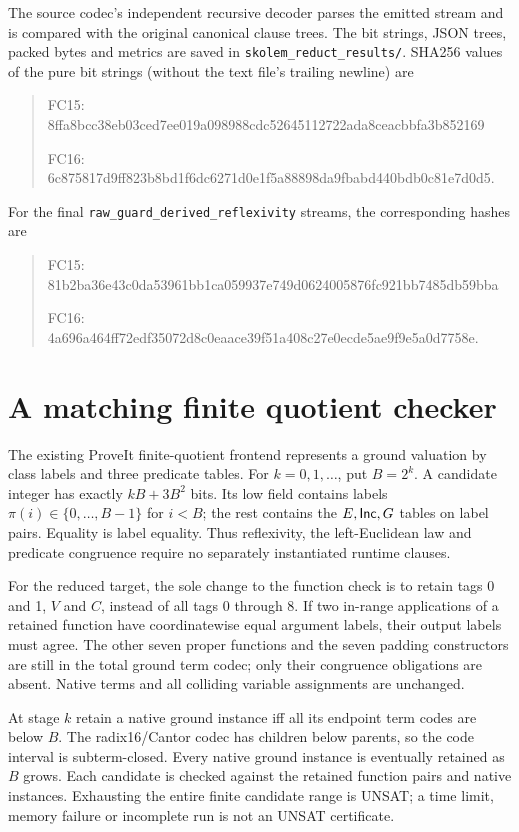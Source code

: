 The source codec's independent recursive decoder parses the emitted stream
and is compared with the original canonical clause trees. The bit strings,
JSON trees, packed bytes and metrics are saved in
\texttt{skolem\_reduct\_results/}. SHA256 values of the pure bit strings
(without the text file's trailing newline) are
\begin{quote}\small\ttfamily
FC15: 8ffa8bcc38eb03ced7ee019a098988cdc52645112722ada8ceacbbfa3b852169\par
FC16: 6c875817d9ff823b8bd1f6dc6271d0e1f5a88898da9fbabd440bdb0c81e7d0d5.
\end{quote}
For the final \texttt{raw\_guard\_derived\_reflexivity} streams, the
corresponding hashes are
\begin{quote}\small\ttfamily
FC15: 81b2ba36e43c0da53961bb1ca059937e749d0624005876fc921bb7485db59bba\par
FC16: 4a696a464ff72edf35072d8c0eaace39f51a408c27e0ecde5ae9f9e5a0d7758e.
\end{quote}

\section{A matching finite quotient checker}

The existing ProveIt finite-quotient frontend represents a ground valuation
by class labels and three predicate tables. For $k=0,1,\ldots$, put
$B=2^k$. A candidate integer has exactly $kB+3B^2$ bits. Its low field
contains labels $\pi(i)\in\{0,\ldots,B-1\}$ for $i<B$; the rest contains
the $E,\mathsf{Inc},G$ tables on label pairs. Equality is label equality.
Thus reflexivity, the left-Euclidean law and predicate congruence require
no separately instantiated runtime clauses.

For the reduced target, the sole change to the function check is to retain
tags 0 and 1, $V$ and $C$, instead of all tags 0 through 8. If two in-range
applications of a retained function have coordinatewise equal argument
labels, their output labels must agree. The other seven proper functions
and the seven padding constructors are still in the total ground term
codec; only their congruence obligations are absent. Native terms and all
colliding variable assignments are unchanged.

At stage $k$ retain a native ground instance iff all its endpoint term
codes are below $B$. The radix16/Cantor codec has children below parents,
so the code interval is subterm-closed. Every native ground instance is
eventually retained as $B$ grows. Each candidate is checked against the
retained function pairs and native instances. Exhausting the entire finite
candidate range is UNSAT; a time limit, memory failure or incomplete run
is not an UNSAT certificate.

